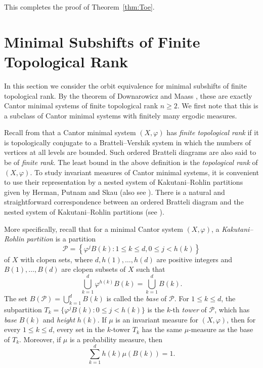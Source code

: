 \documentclass{amsart}
\theoremstyle{definition}
\theoremstyle{problem}
\theoremstyle{remark}
\numberwithin{equation}{section}
\begin{document}
This completes the proof of Theorem~\ref{thm:Toe}.



































\section{Minimal Subshifts of Finite Topological Rank\label{sec:4}}

In this section we consider the orbit equivalence for minimal subshifts of finite topological rank. By the theorem of Downarowicz and Maass \cite{DM}, these are exactly Cantor minimal systems of finite topological rank $n\geq 2$. We first note that this is a subclass of Cantor minimal systems with finitely many ergodic measures.

Recall from \cite{GL} that a Cantor minimal system $(X, \varphi)$ has {\em finite topological rank} if it is topologically conjugate to a Bratteli--Vershik system in which the numbers of vertices at all levels are bounded. Such ordered Bratteli diagrams are also said to be of {\em finite rank}. The least bound in the above definition is the {\em topological rank} of $(X, \varphi)$. To study invariant measures of Cantor minimal systems, it is convenient to use their representation by a nested system of Kakutani--Rohlin partitions given by Herman, Putnam and Skau \cite[Theorem 4.2]{HPS} (also see \cite[Theorem 2.2]{GL}). There is a natural and straightforward correspondence between an ordered Bratteli diagram and the nested system of Kakutani--Rohlin partitions (see \cite[Section 2.5]{GL}). 

More specifically, recall that
 for a minimal Cantor system $(X, \varphi)$, a {\em Kakutani–Rohlin partition} is a
 partition
 $$ \mathcal{P} =\left\{ \varphi^jB(k)\colon 1\leq k\leq d, 0\leq j<h(k)\right\} $$
of $X$ with clopen sets, where $d, h(1), \dots, h(d)$ are positive integers and $B(1), \dots, B(d)$ are
 clopen subsets of $X$ such that
$$\bigcup^d_{k=1} \varphi^{h(k)}B(k) = \bigcup^d_{k=1} B(k). $$
 The set $B(\mathcal{P}) = \bigcup^d_{k=1} B(k)$ is called the {\em base} of $\mathcal{P}$. For $1\leq k\leq d$, the subpartition $T_k =\{\varphi^jB(k)\colon 0\leq  j<h(k)\}$ is the $k$-th {\em tower} of $\mathcal{P}$, which has {\em base} $B(k)$ and {\em height} $h(k)$. If $\mu$ is an invariant measure for $(X, \varphi)$, then for every $1\leq k\leq d$, every set in the $k$-tower $T_k$ has the same $\mu$-measure as the base of $T_k$. Moreover, if $\mu$ is a probability measure, then
$$ \displaystyle\sum_{k=1}^d h(k)\mu(B(k))=1. $$
\end{document}

